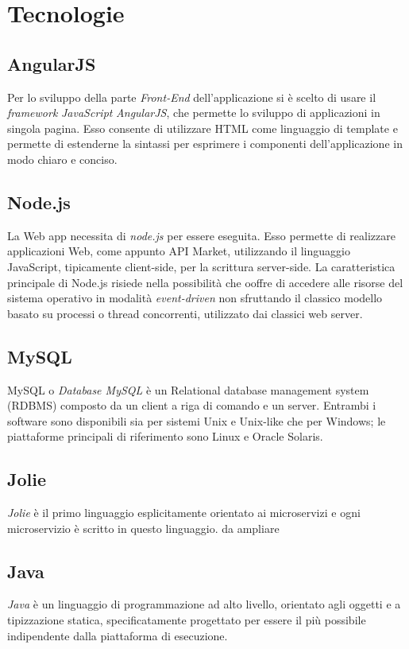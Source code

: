 \newpage
\section{Tecnologie}
\subsection{AngularJS}
Per lo sviluppo della parte \textit{Front-End} dell'applicazione si è scelto di usare il \textit{framework} \textit{JavaScript} \textit{AngularJS}, che permette lo sviluppo di applicazioni in singola pagina. Esso consente di utilizzare HTML come linguaggio di template e permette di estenderne la sintassi per esprimere i componenti dell'applicazione in modo chiaro e conciso.

\subsection{Node.js}
La Web app necessita di \textit{node.js} per essere eseguita. Esso permette di realizzare applicazioni Web, come appunto API Market, utilizzando il linguaggio JavaScript, tipicamente client-side, per la scrittura server-side. La caratteristica principale di Node.js risiede nella possibilità che ooffre di accedere alle risorse del sistema operativo in modalità \textit{event-driven} non sfruttando il classico modello basato su processi o thread concorrenti, utilizzato dai classici web server.

\subsection{MySQL}
MySQL o \textit{Database MySQL} è un Relational database management system (RDBMS) composto da un client a riga di comando e un server. Entrambi i software sono disponibili sia per sistemi Unix e Unix-like che per Windows; le piattaforme principali di riferimento sono Linux e Oracle Solaris.


\subsection{Jolie}
\textit{Jolie} è il primo linguaggio esplicitamente orientato ai microservizi e ogni microservizio è scritto in questo linguaggio.
da ampliare

\subsection{Java}
 \textit{Java} è un linguaggio di programmazione ad alto livello, orientato agli oggetti e a tipizzazione statica, specificatamente progettato per essere il più possibile indipendente dalla piattaforma di esecuzione.
 
